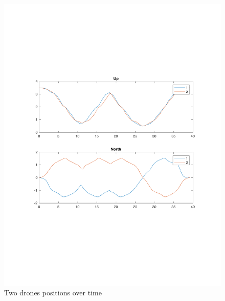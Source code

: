 \begin{figure}[h]
\centering
\includegraphics[width=1.0\textwidth]{chapters/chapter-04/figures/overlapped_2.pdf}
\caption{Two drones positions over time}
\label{fig:overlapped_2}
\end{figure}
